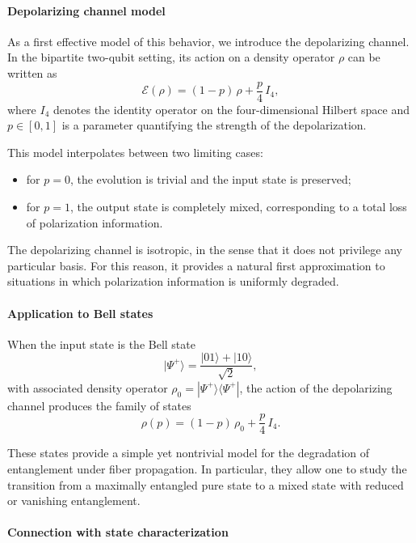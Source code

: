 \documentclass[a4paper]{article}
\begin{document}
\paragraph{Depolarizing channel model}

As a first effective model of this behavior, we introduce the depolarizing channel. In the bipartite two-qubit setting, its action on a density operator \(\rho\) can be written as
\[
\mathcal{E}(\rho)
=
(1 - p)\,\rho
+
\frac{p}{4}\, I_4,
\]
where \(I_4\) denotes the identity operator on the four-dimensional Hilbert space and \(p \in [0,1]\) is a parameter quantifying the strength of the depolarization.

\medskip

This model interpolates between two limiting cases:

\begin{itemize}
    \item for \(p = 0\), the evolution is trivial and the input state is preserved;
    \item for \(p = 1\), the output state is completely mixed, corresponding to a total loss of polarization information.
\end{itemize}

The depolarizing channel is isotropic, in the sense that it does not privilege any particular basis. For this reason, it provides a natural first approximation to situations in which polarization information is uniformly degraded.

\paragraph{Application to Bell states}

When the input state is the Bell state
\[
|\Psi^+\rangle = \frac{|01\rangle + |10\rangle}{\sqrt{2}},
\]
with associated density operator \(\rho_0 = |\Psi^+\rangle\langle\Psi^+|\), the action of the depolarizing channel produces the family of states
\[
\rho(p)
=
(1 - p)\,\rho_0
+
\frac{p}{4}\, I_4.
\]

These states provide a simple yet nontrivial model for the degradation of entanglement under fiber propagation. In particular, they allow one to study the transition from a maximally entangled pure state to a mixed state with reduced or vanishing entanglement.

\paragraph{Connection with state characterization}
\end{document}
